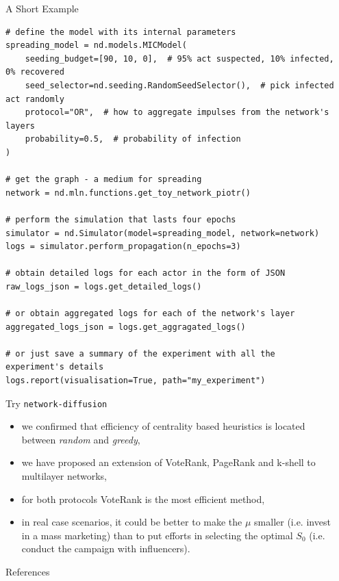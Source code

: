 \documentclass[final]{beamer}
\newlength{\sepwidth}
\newlength{\colwidth}
\newcommand{\separatorcolumn}{\begin{column}{\sepwidth}\end{column}}
\begin{document}
\begin{frame}[t, fragile]
\begin{columns}[t]
\begin{column}{\colwidth}
\begin{alertblock}{A Short Example}
\begin{lstlisting}[style=py, basicstyle=\footnotesize\ttfamily]
# define the model with its internal parameters
spreading_model = nd.models.MICModel(
    seeding_budget=[90, 10, 0],  # 95% act suspected, 10% infected, 0% recovered
    seed_selector=nd.seeding.RandomSeedSelector(),  # pick infected act randomly
    protocol="OR",  # how to aggregate impulses from the network's layers
    probability=0.5,  # probability of infection
)

# get the graph - a medium for spreading
network = nd.mln.functions.get_toy_network_piotr()

# perform the simulation that lasts four epochs
simulator = nd.Simulator(model=spreading_model, network=network)
logs = simulator.perform_propagation(n_epochs=3)

# obtain detailed logs for each actor in the form of JSON
raw_logs_json = logs.get_detailed_logs()

# or obtain aggregated logs for each of the network's layer
aggregated_logs_json = logs.get_aggragated_logs()

# or just save a summary of the experiment with all the experiment's details
logs.report(visualisation=True, path="my_experiment")
\end{lstlisting}
\end{alertblock}
    
\begin{exampleblock}{Try \lstinline[style=py, basicstyle=\large\ttfamily]{network-diffusion}}
    \begin{itemize}
        \item we confirmed that efficiency of centrality based heuristics is located between \textit{random} and \textit{greedy},
        \item we have proposed an extension of VoteRank, PageRank and k-shell to multilayer networks,
        \item for both protocols VoteRank is the most efficient method,
        \item in real case scenarios, it could be better to make the $\mu$ smaller (i.e. invest in a mass marketing) than to put efforts in selecting the optimal $S_{0}$ (i.e. conduct the campaign with influencers).
    \end{itemize}
\end{exampleblock}

\begin{block}{References}
    \printbibliography
\end{block}

\end{column}
\separatorcolumn

\end{columns}
\end{frame}
\end{document}
